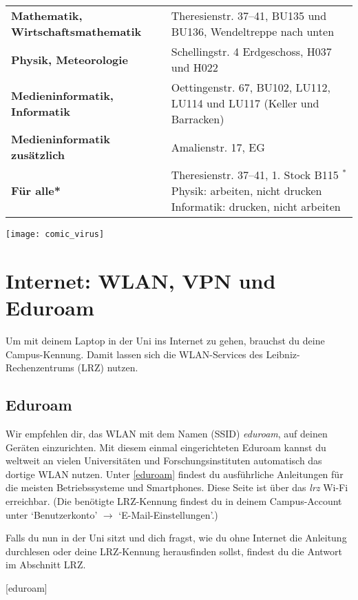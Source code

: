 \begin{tabularx}{\linewidth}{lX}
\textbf{Mathematik, Wirtschaftsmathematik} %
& Theresienstr. 37--41, BU135 und BU136, Wendeltreppe nach unten\\
\textbf{Physik, Meteorologie} %
& Schellingstr. 4 Erdgeschoss, H037 und H022\\
\textbf{Medieninformatik, Informatik}  %
& Oettingenstr. 67, BU102, LU112, LU114 und LU117 (Keller und Barracken)\\
\textbf{Medieninformatik zusätzlich} %
& Amalienstr. 17, EG\\
\textbf{Für alle*}    %
& Theresienstr. 37--41, 1. Stock B115 \newline
\footnotesize{$^*$Physik: arbeiten, nicht drucken \newline $\phantom{^*}$Informatik: drucken, nicht arbeiten}
\end{tabularx}

\begin{center}
	{\texttt{[image: comic\_virus]}}
\end{center}

\section{Internet: WLAN, VPN und Eduroam}
Um mit deinem Laptop in der Uni ins Internet zu gehen, brauchst du
deine Campus-Kennung. Damit lassen sich die WLAN-Services des
Leibniz-Rechen\-zentrums (LRZ) nutzen.

\subsection*{Eduroam}
Wir empfehlen dir, das WLAN mit dem Namen (SSID) \emph{eduroam}, auf deinen Geräten einzurichten. Mit diesem einmal eingerichteten Eduroam kannst du weltweit an vielen Universitäten und Forschungsinstituten automatisch das dortige WLAN nutzen. Unter \ref{eduroam} findest du ausführliche Anleitungen für die meisten Betriebssysteme und Smart\-phones.
Diese Seite ist über das \emph{lrz} Wi-Fi erreichbar.
(Die benötigte LRZ-Kennung findest du in deinem Campus-Account unter `Benutzerkonto' $\rightarrow$ `E-Mail-Einstellungen'.)

Falls du nun in der Uni sitzt und dich fragst, wie du ohne Internet
die Anleitung durchlesen oder deine LRZ-Kennung herausfinden sollst, 
findest du die Antwort im Abschnitt LRZ.
\begin{urlList}
	[eduroam]
\end{urlList}

